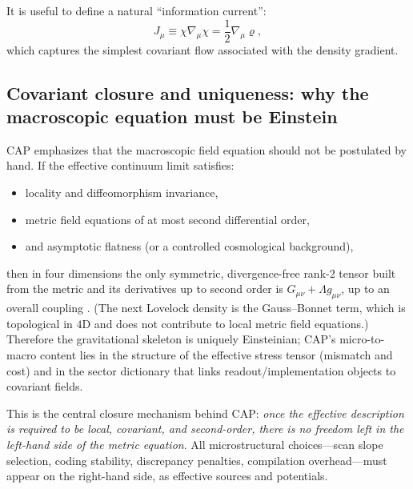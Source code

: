 It is useful to define a natural ``information current'':
\begin{equation}
  J_{\mu} \equiv \chi \nabla_{\mu}\chi = \frac{1}{2}\nabla_{\mu}\varrho ,
\end{equation}
which captures the simplest covariant flow associated with the density gradient.

\subsection{Covariant closure and uniqueness: why the macroscopic equation must be Einstein}
\label{subsec:uniqueness}

CAP emphasizes that the macroscopic field equation should not be postulated by hand. If the effective continuum limit satisfies:
\begin{itemize}
  \item locality and diffeomorphism invariance,
  \item metric field equations of at most second differential order,
  \item and asymptotic flatness (or a controlled cosmological background),
\end{itemize}
then in four dimensions the only symmetric, divergence-free rank-2 tensor built from the metric and its derivatives up to second order is $G_{\mu\nu}+\Lambda g_{\mu\nu}$, up to an overall coupling \cite{Lovelock1971}. (The next Lovelock density is the Gauss--Bonnet term, which is topological in $4$D and does not contribute to local metric field equations.) Therefore the gravitational skeleton is uniquely Einsteinian; CAP's micro-to-macro content lies in the structure of the effective stress tensor (mismatch and cost) and in the sector dictionary that links readout/implementation objects to covariant fields.

This is the central closure mechanism behind CAP: \emph{once the effective description is required to be local, covariant, and second-order, there is no freedom left in the left-hand side of the metric equation}. All microstructural choices---scan slope selection, coding stability, discrepancy penalties, compilation overhead---must appear on the right-hand side, as effective sources and potentials.


